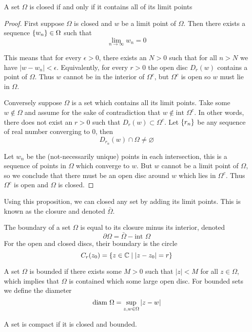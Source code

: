 \begin{proposition}
	A set $\Omega$ is closed if and only if it contains all of its limit points
\end{proposition}
\begin{proof}
	First suppose $\Omega$ is closed and $w$ be a limit point of $\Omega$. Then there exists a sequence $\left\{w_n\right\} \in \Omega$ such that 
	\[ \lim_{n \to \infty} w_n = 0 \]
	
	This means that for every $\epsilon > 0$, there exists an $N > 0$ such that for all $n > N$ we have $|w - w_n| < \epsilon$. Equivalently, for every $r > 0$ the open disc $D_r(w)$ contains a point of $\Omega$. Thus $w$ cannot be in the interior of $\Omega^c$, but $\Omega^c$ is open so $w$ must lie in $\Omega$. 
	
	Conversely suppose $\Omega$ is a set which contains all its limit points. Take some $w \not\in \Omega$ and assume for the sake of contradiction that $w \not\in \text{int } \Omega^c$. In other words, there does not exist an $r > 0$ such that $D_r(w) \subset \Omega^c$. Let $\left\{r_n\right\}$ be any sequence of real number converging to 0, then
	\[ D_{r_n}(w) \cap \Omega \neq \varnothing \]
	
	Let $w_n$ be the (not-necessarily unique) points in each intersection, this is a sequence of points in $\Omega$ which converge to $w$. But $w$ cannot be a limit point of $\Omega$, so we conclude that there must be an open disc around $w$ which lies in $\Omega^c$. Thus $\Omega^c$ is open and $\Omega$ is closed.
\end{proof}

Using this proposition, we can closed any set by adding its limit points. This is known as the closure and denoted $\bar\Omega$.

The boundary of a set $\Omega$ is equal to its closure minus its interior, denoted
\[ \partial \Omega = \bar\Omega - \text{int } \Omega \]
For the open and closed discs, their boundary is the circle
\[ C_r(z_0) = \left\{z \in \mathbb{C} \mid \abs{z - z_0} = r\right\} \]

A set $\Omega$ is bounded if there exists some $M > 0$ such that $|z| < M$ for all $z \in \Omega$, which implies that $\Omega$ is contained which some large open disc. For bounded sets we define the diameter
\[ \text{diam } \Omega = \sup_{z, w\in \Omega} \abs{z - w} \]

A set is compact if it is closed and bounded.


